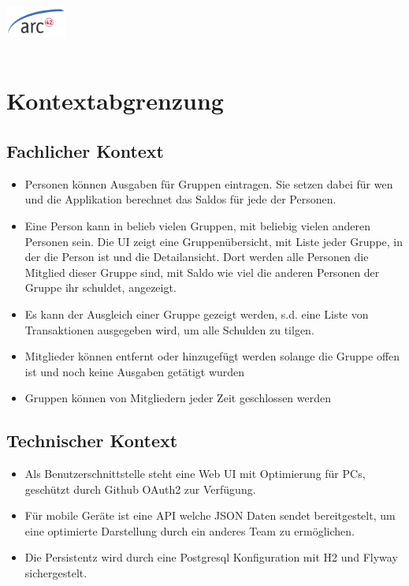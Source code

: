 \documentclass[
]{article}
\begin{document}
\includegraphics[width=20mm, height=20mm]{images/arc42-logo.png}
\hypertarget{section-system-scope-and-context}{%
\section{Kontextabgrenzung}\label{section-system-scope-and-context}}

\hypertarget{_fachlicher_kontext}{%
\subsection{Fachlicher Kontext}\label{_fachlicher_kontext}}

\begin {itemize} 
\item Personen können Ausgaben für Gruppen eintragen. Sie setzen dabei für wen und die Applikation berechnet das Saldos für jede der Personen.
\item Eine Person kann in belieb vielen Gruppen, mit beliebig vielen anderen Personen sein. Die UI zeigt eine Gruppenübersicht, mit Liste jeder Gruppe, in der die Person ist und die Detailansicht. Dort werden alle Personen die Mitglied dieser Gruppe sind, mit Saldo wie viel die anderen Personen der Gruppe ihr schuldet, angezeigt.
\item Es kann der Ausgleich einer Gruppe gezeigt werden, s.d. eine Liste von Transaktionen ausgegeben wird, um alle Schulden zu tilgen.
\item Mitglieder können entfernt oder hinzugefügt werden solange die Gruppe offen ist und noch keine Ausgaben getätigt wurden
\item Gruppen können von Mitgliedern jeder Zeit geschlossen werden
\end {itemize}

\hypertarget{_technischer_kontext}{%
\subsection{Technischer Kontext}\label{_technischer_kontext}}

\begin {itemize} 
\item Als Benutzerschnittstelle steht eine Web UI mit Optimierung für PCs, geschützt durch Github OAuth2 zur Verfügung. 
\item Für mobile Geräte ist eine API welche JSON Daten sendet bereitgestelt, um eine optimierte Darstellung durch ein anderes Team zu ermöglichen.
\item Die Persistentz wird durch eine Postgresql Konfiguration mit H2 und Flyway sichergestelt.
\end {itemize}
\end{document}

